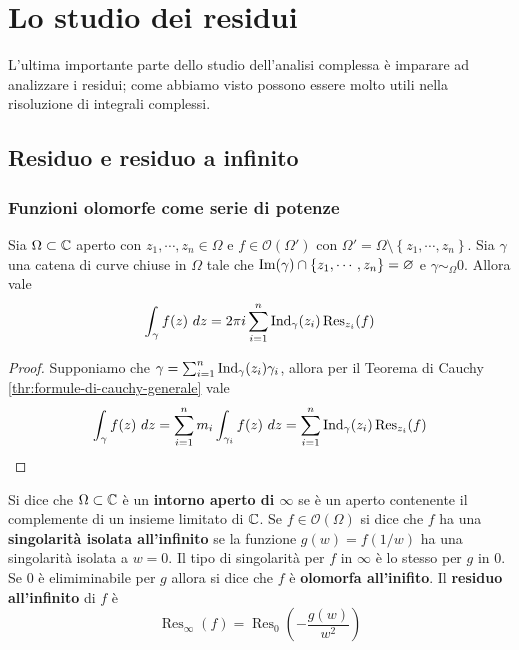 \def \Res {\operatorname{Res}}

\chapter{Lo studio dei residui}
L'ultima importante parte dello studio dell'analisi complessa è imparare ad analizzare i residui; come abbiamo visto possono essere molto utili nella risoluzione di integrali complessi.
\newpage
\section{Residuo e residuo a infinito}
\subsection{\textcolor{AnComp}{\textbf{Funzioni olomorfe come serie di potenze}}}
\begin{theorem}
  Sia $\Omega \subset \mathbb{C}$ aperto con $z_1, \cdots, z_n \in \Omega$ e $f \in
  \mathcal{O}(\Omega')$ con $\Omega' = \Omega \setminus \left\{ z_1,\cdots, z_n
  \right\}$. Sia $\gamma$ una catena di curve chiuse in $\Omega$ tale che
  $\operatorname{Im}(\gamma) \cap \left\{ z_1, \cdots,z_n \right\} = \varnothing$ e $\gamma
  \sim_\Omega 0$. Allora vale 
  \begin{equation*}
    \int_\gamma f(z)\ dz = 2 \pi i \sum_{i=1}^{n} \Ind_\gamma(z_i)
    \Res_{z_i}(f)
  \end{equation*}
  \label{thr:teorema_dei_residui}
\end{theorem}
\begin{proof}
  Supponiamo che $\gamma = \sum_{i=1}^n \operatorname{Ind}_\gamma (z_i) \gamma_i$, allora
  per il Teorema di Cauchy \ref{thr:formule-di-cauchy-generale} vale 
  \begin{equation*}
    \int_\gamma f(z) \ dz = \sum_{i = 1}^{n} m_i \int_{\gamma_i} f(z) \ dz
    = \sum_{i=1}^n \Ind_\gamma(z_i) \Res_{z_i}(f)
  \end{equation*}
\end{proof}

\begin{definition}
  Si dice che $\Omega \subset \mathbb{C}$ è un \textbf{intorno aperto di $\infty$} se
  è un aperto contenente il complemente di un insieme limitato di $\mathbb{C}$. Se $f
  \in \mathcal{O}(\Omega)$ si dice che $f$ ha una \textbf{singolarità isolata
  all'infinito} se la funzione $g(w) = f(1/w)$ ha una singolarità isolata a $w
  = 0$. Il tipo di singolarità per $f$ in $\infty$ è lo stesso per $g$ in $0$.
  Se $0$ è elimiminabile per $g$ allora si dice che $f$ è \textbf{olomorfa
  all'inifito}. Il \textbf{residuo all'infinito} di $f$ è 
  \begin{equation*}
    \Res_\infty(f) = \Res_0\left( -\frac{g(w)}{w^2} \right)
  \end{equation*}
  \label{def:varie_definizioni_all'inifinito}
\end{definition}


